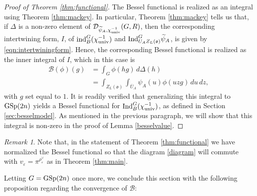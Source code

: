 \documentclass[11pt,letterpaper]{article}
\newcommand{\calB}{\mathcal{B}}
\newcommand{\calD}{\mathcal{D}}
\newcommand{\ve}{\varepsilon}
\newcommand{\goth}{\mathfrak}
\newcommand{\GSp}{\textup{GSp}}
\newcommand{\Ind}{\textup{Ind}}
\newcommand{\ind}{\textup{ind}}
\theoremstyle{remark}
\newtheorem*{remark}{Remark}
\numberwithin{equation}{section}
\begin{document}
\begin{proof}[Proof of Theorem \ref{thm:functional}]
The Bessel functional is realized as an integral using Theorem \ref{thm:mackey}. In particular, Theorem \ref{thm:mackey} tells us that, if $\Delta$ is a non-zero element of $\calD_{\widetilde{\psi}_A,\chi_{\textup{univ}}^{-1}}(G,R)$, then the corresponding intertwining form, $I$, of $\ind_B^G (\chi_{\textup{univ}}^{-1})$ and $\Ind_{U_AZ_L(\goth{o})}^G \widetilde{\psi}_A$, is given by \eqref{eqn:intertwiningform}. Hence, the corresponding Bessel functional is realized as the inner integral of $I$, which in this case is 
\begin{align*}
\calB(\phi)(g) &= \int_G \phi(hg)\,d\Delta(h)
\\&= \int_{Z_L(\goth{o})}\int_{\overline{U}_A} \psi_A(u)\phi(uzg)\,du\,dz,
\end{align*}
with $g$ set equal to $1$. It is readily verified that generalizing this integral to $\GSp(2n)$ yields a Bessel functional for $\Ind_B^G(\chi_{\textup{univ}}^{-1})$, as defined in Section \ref{sec:besselmodel}. As mentioned in the previous paragraph, we will show that this integral is non-zero in the proof of Lemma \ref{besselvalue}. 
\end{proof}

\begin{remark}
Note that, in the statement of Theorem \ref{thm:functional} we have normalized the Bessel functional so that the diagram \eqref{diagram} will commute with $v_{\ve} = \pi^{\rho_{\ve}^{\vee}}$ as in Theorem \ref{thm:main}. %
\end{remark}


Letting $G = \GSp(2n)$ once more, we conclude this section with the following proposition regarding the convergence of $\calB$: 
\end{document}
